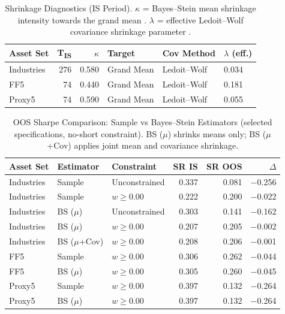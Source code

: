 \documentclass[11pt]{exam}
\begin{document}
\begin{table}[H]
\centering
\caption{Shrinkage Diagnostics (IS Period). $\kappa$ = Bayes--Stein mean shrinkage intensity towards the grand mean \parencite{jorion1986}. $\lambda$ = effective Ledoit--Wolf covariance shrinkage parameter \parencite{ledoit2004}.}
\label{tab:8_3_diag}
\small
\begin{tabular}{lrrlll}
\hline
\textbf{Asset Set} & \textbf{T\textsubscript{IS}} & \textbf{$\kappa$} & \textbf{Target} & \textbf{Cov Method} & \textbf{$\lambda$ (eff.)} \\
\hline
Industries & 276 & 0.580 & Grand Mean & Ledoit--Wolf & 0.034 \\
FF5        & 74  & 0.440 & Grand Mean & Ledoit--Wolf & 0.181 \\
Proxy5     & 74  & 0.590 & Grand Mean & Ledoit--Wolf & 0.055 \\
\hline
\end{tabular}
\end{table}

\begin{table}[H]
\centering
\caption{OOS Sharpe Comparison: Sample vs Bayes--Stein Estimators (selected specifications, no-short constraint). BS ($\mu$) shrinks means only; BS ($\mu$+Cov) applies joint mean and covariance shrinkage.}
\label{tab:8_3_sharpe}
\small
\begin{tabular}{lllrrr}
\hline
\textbf{Asset Set} & \textbf{Estimator} & \textbf{Constraint} & \textbf{SR IS} & \textbf{SR OOS} & \textbf{$\Delta$} \\
\hline
Industries & Sample           & Unconstrained & 0.337 & 0.081 & $-$0.256 \\
Industries & Sample           & $w\geq0.00$   & 0.222 & 0.200 & $-$0.022 \\
Industries & BS ($\mu$)       & Unconstrained & 0.303 & 0.141 & $-$0.162 \\
Industries & BS ($\mu$)       & $w\geq0.00$   & 0.207 & 0.205 & $-$0.002 \\
Industries & BS ($\mu$+Cov)   & $w\geq0.00$   & 0.208 & 0.206 & $-$0.001 \\
\hline
FF5        & Sample           & $w\geq0.00$   & 0.306 & 0.262 & $-$0.044 \\
FF5        & BS ($\mu$)       & $w\geq0.00$   & 0.305 & 0.260 & $-$0.045 \\
\hline
Proxy5     & Sample           & $w\geq0.00$   & 0.397 & 0.132 & $-$0.264 \\
Proxy5     & BS ($\mu$)       & $w\geq0.00$   & 0.397 & 0.132 & $-$0.264 \\
\hline
\end{tabular}
\end{table}
\end{document}
